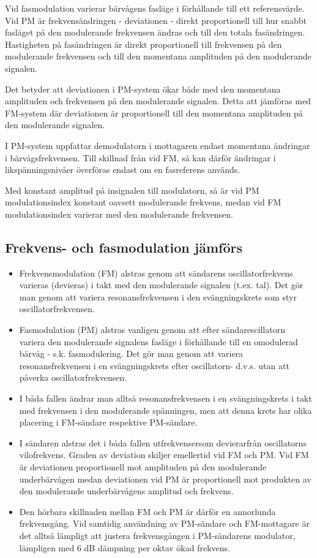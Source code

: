 Vid fasmodulation varierar bärvågens fasläge i förhållande till ett
referensvärde. Vid PM är frekvensändringen - deviationen - direkt proportionell
till hur snabbt fasläget på den modulerande frekvensen ändras och till den
totala fasändringen. Hastigheten på fasändringen är direkt proportionell till
frekvensen på den modulerande frekvensen och till den momentana amplituden på
den modulerande signalen.

Det betyder att deviationen i PM-system ökar både med den momentana amplituden
och frekvensen på den modulerande signalen. Detta att jämföras med FM-system där
deviationen är proportionell till den momentana amplituden på den modulerande
signalen.

I PM-system uppfattar demodulatorn i mottagaren endast momentana ändringar i
bärvågsfrekvensen. Till skillnad från vid FM, så kan därför ändringar i
likspänningsnivåer överföras endast om en fasreferens används.

Med konstant amplitud på insignalen till modulatorn, så är vid PM
modulationsindex konstant oavsett modulerande frekvens, medan vid FM
modulationsindex varierar med den modulerande frekvensen.

\subsection{Frekvens- och fasmodulation jämförs}

\begin{itemize}
\item Frekvensmodulation (FM) alstras genom att sändarens oscillatorfrekvens
varieras (devieras) i takt med den modulerande signalen (t.ex. tal). Det gör man
genom att variera resonansfrekvensen i den svängningskrets som styr
oscillatorfrekvensen.

\item Fasmodulation (PM) alstras vanligen genom att efter sändarescillatorn
variera den modulerande signalens fasläge i förhållande till en omodulerad
bärvåg - s.k. fasmodulering. Det gör man genom att variera resonansfrekvensen i
en svängningskrets efter oscillatorn- d.v.s. utan att påverka
oscillatorfrekvensen.

\item I båda fallen ändrar man alltså resonansfrekvensen i en svängningskrets i
takt med frekvensen i den modulerande spänningen, men att denna krets har olika
placering i FM-sändare respektive PM-sändare.

\item I sändaren alstras det i båda fallen utfrekvensersom devierarfrån
oscillatorns vilofrekvens. Graden av deviation skiljer emellertid vid FM och PM.
Vid FM är deviationen proportionell mot amplituden på den modulerande
underbärvågen medan deviationen vid PM är proportionell mot produkten av den
modulerande underbärvågens amplitud och frekvens.

\item Den hörbara skillnaden mellan FM och PM är därför en annorlunda
frekvensgång. Vid samtidig användning av PM-sändare och FM-mottagare är det
alltså lämpligt att justera frekvensgången i PM-sändarens modulator, lämpligen
med 6 dB dämpning per oktav ökad frekvens.
\end{itemize}

